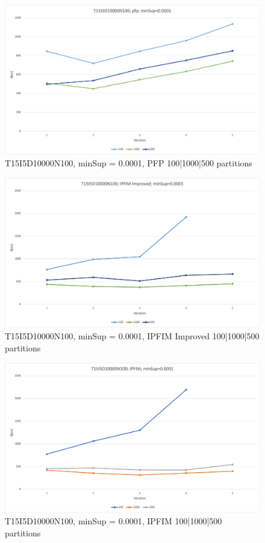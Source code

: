 \begin{figure}
  \centering
  \includegraphics[width=\linewidth]{figures/4iterations/T15I5D10000N100_pfp_0001}
  \caption{T15I5D10000N100, minSup = 0.0001,  PFP 100|1000|500 partitions}
  \label{fig:T15I5D10000N100_pfp_0001}
\end{figure}


\begin{figure}
  \centering
  \includegraphics[width=\linewidth]{figures/4iterations/T15I5D10000N100_ipfim_imp_0001}
  \caption{T15I5D10000N100, minSup = 0.0001,  IPFIM Improved 100|1000|500 partitions}
  \label{fig:T15I5D10000N100_ipfim_imp_0001}
\end{figure}

\begin{figure}
  \centering
  \includegraphics[width=\linewidth]{figures/4iterations/T15I5D10000N100_ipfim_0001}
  \caption{T15I5D10000N100, minSup = 0.0001,  IPFIM 100|1000|500 partitions}
  \label{fig:T15I5D10000N100_ipfim_0001}
\end{figure}

